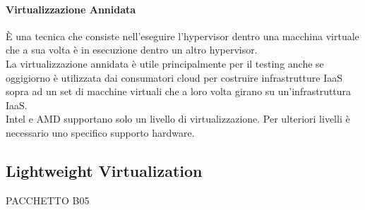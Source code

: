 \documentclass{article}
\begin{document}
\paragraph{Virtualizzazione Annidata}
È una tecnica che consiste nell’eseguire l’hypervisor dentro una macchina virtuale che a sua volta è in esecuzione dentro un altro hypervisor.\\
La virtualizzazione annidata è utile principalmente per il testing anche se oggigiorno è utilizzata dai consumatori cloud per costruire infrastrutture IaaS sopra ad un set di macchine virtuali che a loro volta girano su un’infrastruttura IaaS.\\
Intel e AMD supportano solo un livello di virtualizzazione. Per ulteriori livelli è necessario uno specifico supporto hardware.

\newpage
\subsection{Lightweight Virtualization}
PACCHETTO B05\\ \\
\end{document}
